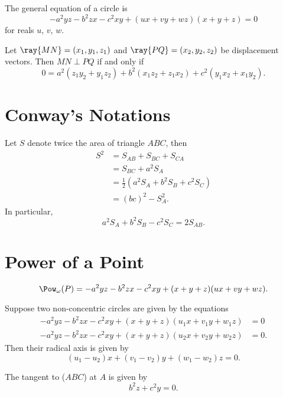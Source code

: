 \documentclass[11pt]{scrartcl}
\begin{document}
\begin{theorem}
  The general equation of a circle is
  \[-a^2yz-b^2zx-c^2xy+(ux+vy+wz)(x+y+z)=0\]
  for reals $u$, $v$, $w$.
\end{theorem}

\begin{theorem}
  Let $\ray{MN} = (x_1, y_1, z_1)$ and $\ray{PQ} = 
(x_2, y_2, z_2)$ be displacement vectors. Then $MN \perp PQ$ if and only if
\[0 = a^2(z_1y_2 + y_1z_2) + b^2(x_1z_2 + z_1x_2) + c^2(y_1x_2 + x_1y_2).\]
\end{theorem}

\section{Conway's Notations}
\begin{proposition}
  Let $S$ denote twice the area of triangle $ABC$, then
  \begin{align*}
    S^2 &= S_{AB} + S_{BC} + S_{CA}\\
        &= S_{BC} + a^2S_A\\
        &= \frac{1}{2}(a^2S_A + b^2S_B + c^2S_C)\\
        &= (bc)^2 - S_A^2.
  \end{align*}
  In particular,
  \[a^2S_A + b^2S_B - c^2S_C = 2S_{AB}.\]
\end{proposition}
\section{Power of a Point}
\begin{lemma}
  \[\Pow_\omega(P) = - a^2yz - b^2zx - c^2xy + (x + y + z)(ux + vy + wz).\]
\end{lemma}

\begin{lemma}
  Suppose two non-concentric circles are given by the equations
  \begin{align*}
    - a^2yz - b^2zx - c^2xy + (x + y + z)(u_1x + v_1y + w_1z) &= 0\\
    - a^2yz - b^2zx - c^2xy + (x + y + z)(u_2x + v_2y + w_2z) &= 0.
  \end{align*}
  Then their radical axis is given by
  \[(u_1 - u_2)x + (v_1 - v_2)y + (w_1 - w_2)z = 0.\]
\end{lemma}
\begin{lemma}
  The tangent to ($ABC$) at $A$ is given by
  \[b^2z + c^2y = 0.\]
\end{lemma}
\end{document}
